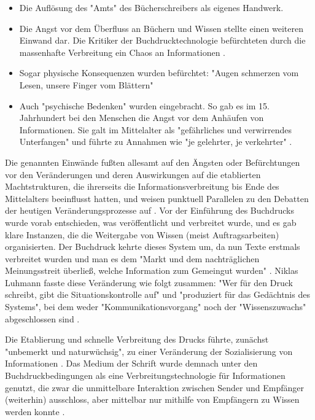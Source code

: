 \begin{itemize}
\item Die Auflösung des "Amts" des Bücherschreibers als eigenes Handwerk.
\item Die Angst vor dem Überfluss an Büchern und Wissen stellte einen weiteren Einwand dar. Die Kritiker der Buchdrucktechnologie befürchteten  durch die massenhafte Verbreitung ein Chaos an Informationen \cite{Giesecke_1991}.
\item Sogar physische Konsequenzen wurden befürchtet: "Augen schmerzen vom Lesen, unsere Finger vom Blättern" \cite{Giesecke_1991}
\item Auch "psychische Bedenken" wurden eingebracht. So gab es im 15. Jahrhundert bei den Menschen die Angst vor dem Anhäufen von Informationen. Sie galt im Mittelalter als "gefährliches und verwirrendes Unterfangen" und führte zu Annahmen wie "je gelehrter, je verkehrter" \cite{Giesecke_1991}.
\end{itemize}

Die genannten Einwände fußten allesamt auf den Ängsten oder Befürchtungen vor den Veränderungen und deren Auswirkungen auf die etablierten Machtstrukturen, die ihrerseits die Informationsverbreitung bis Ende des Mittelalters beeinflusst hatten, und weisen punktuell Parallelen zu den Debatten der heutigen Veränderungsprozesse auf \cite{Hagner_2015}. Vor der Einführung des Buchdrucks wurde vorab entschieden, was veröffentlicht und verbreitet wurde, und es gab klare Instanzen, die die Weitergabe von Wissen (meist Auftragsarbeiten) organisierten. Der Buchdruck kehrte dieses System um, da nun Texte erstmals verbreitet wurden und man es dem "Markt und dem nachträglichen Meinungsstreit überließ, welche Information zum Gemeingut wurden" \cite{Giesecke_1991}. Niklas Luhmann fasste diese Veränderung wie folgt zusammen: "Wer für den Druck schreibt, gibt die Situationskontrolle auf" und "produziert für das Gedächtnis des Systems", bei dem weder "Kommunikationsvorgang" noch der "Wissenszuwachs" abgeschlossen sind \cite[:57]{Luhmann_1998}.

Die Etablierung und schnelle Verbreitung \cite{Stober_2014} des Drucks führte, zunächst "unbemerkt und naturwüchsig", zu einer Veränderung der Sozialisierung von Informationen \cite{Giesecke_1991}. Das Medium der Schrift wurde demnach unter den Buchdruckbedingungen als eine Verbreitungstechnologie für Informationen genutzt, die zwar die unmittelbare Interaktion zwischen Sender und Empfänger (weiterhin) ausschloss, aber mittelbar nur mithilfe von Empfängern zu Wissen werden konnte \cite{Luhmann_1998}.

